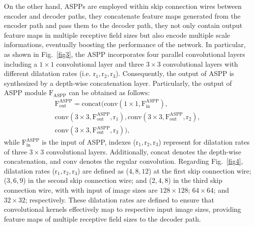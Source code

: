 \documentclass[journal]{IEEEtran} %
\begin{document}
On the other hand, ASPPs \cite{ChenAtrous} are employed within skip connection wires between encoder and decoder paths, they concatenate feature maps generated from the encoder path and pass them to the decoder path, they not only contain output feature maps in multiple receptive field sizes but also encode multiple scale informations, eventually boosting the performance of the network. In particular, as shown in Fig.~\ref{fig3}, the ASPP incorporates four parallel convolutional layers including a $\mathrm{1\times1}$ convolutional layer and three $\mathrm{3\times3}$ convolutional layers with different dilatation rates (i.e. $\mathrm{r_1, r_2, r_3}$). Consequently, the output of ASPP is synthesized by a depth-wise concatenation layer. Particularly, the output of ASPP module $\mathrm{F_{\text{ASPP}}}$ can be obtained as follows:
\begin{equation}
\begin{aligned}
    \mathrm{F}^\text{ASPP}_\text{out} =  \text{concat} (\text{conv}(1\times1,\mathrm{F}^\text{ASPP}_\text{in}), \\ 
     \mathrm{conv(3\times3,F^\text{ASPP}_\text{out},r_1)},\mathrm{conv(3 \times 3,F^\text{ASPP}_\text{out},r_2)}, \\ \mathrm{conv(3\times3,F^\text{ASPP}_\text{out},r_3))},
    \label{eq:ASPP}
\end{aligned}
\end{equation}
while $\mathrm{F}^\text{ASPP}_\text{in}$ is the input of ASPP, indexes ($\mathrm{r_1, r_2, r_3}$) represent for dilatation rates of three $\mathrm{3\times3}$ convolutional layers. Additionally, $\text{concat}$ denotes the depth-wise concatenation, and $\mathrm{conv}$ denotes the regular convolution. Regarding Fig.~\ref{fig4}, dilatation rates ($\mathrm{r_1, r_2, r_3}$) are defined as ($4, 8, 12$) at the first skip connection wire; ($3, 6, 9$) in the second skip connection wire; and ($2, 4, 8$) in the third skip connection wire, with with input of image sizes are $128\times128$; $64\times64$; and $32\times32$; respectively. These dilatation rates are defined to ensure that convolutional kernels effectively map to respective input image sizes, providing feature maps of multiple receptive field sizes to the decoder path.
\end{document}

